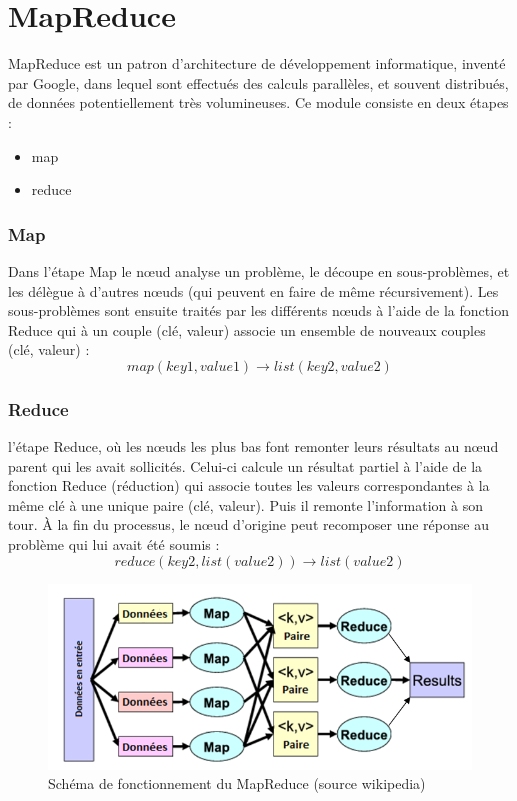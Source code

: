 \section{MapReduce}

MapReduce est un patron d'architecture de développement informatique, inventé par Google, dans lequel sont effectués des calculs parallèles, et souvent distribués, de données potentiellement très volumineuses.
Ce module consiste en deux étapes :
\begin{itemize}
	\item map
	\item reduce
\end{itemize}

\subsubsection{Map}

Dans l'étape Map le nœud analyse un problème, le découpe en sous-problèmes, et les délègue à d'autres nœuds (qui peuvent en faire de même récursivement). Les sous-problèmes sont ensuite traités par les différents nœuds à l'aide de la fonction Reduce qui à un couple (clé, valeur) associe un ensemble de nouveaux couples (clé, valeur) :
\begin{equation}
map(key1,value1) → list(key2,value2)
\end{equation}


\subsubsection{Reduce}

l'étape Reduce, où les nœuds les plus bas font remonter leurs résultats au nœud parent qui les avait sollicités. Celui-ci calcule un résultat partiel à l'aide de la fonction Reduce (réduction) qui associe toutes les valeurs correspondantes à la même clé à une unique paire (clé, valeur). Puis il remonte l'information à son tour.
À la fin du processus, le nœud d'origine peut recomposer une réponse au problème qui lui avait été soumis :
\begin{equation}
reduce(key2,list(value2))→ list(value2)
\end{equation}



\begin{figure}[htpb]
	\centering
	\includegraphics[scale = 0.5]{images/Mapreduce}
	\caption{Schéma de fonctionnement du MapReduce (source wikipedia)}
	\label{fig:MapReduce}
\end{figure}


